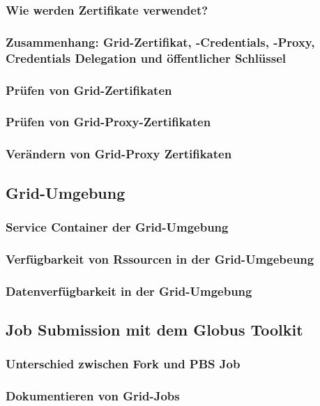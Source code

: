 	\subsubsection*{Wie werden Zertifikate verwendet?}
	\subsubsection*{Zusammenhang: Grid-Zertifikat, -Credentials, -Proxy, Credentials Delegation und öffentlicher Schlüssel}

	\subsubsection*{Prüfen von Grid-Zertifikaten}
	\subsubsection*{Prüfen von Grid-Proxy-Zertifikaten}
	\subsubsection*{Verändern von Grid-Proxy Zertifikaten}

\subsection{Grid-Umgebung}
	\subsubsection*{Service Container der Grid-Umgebung}
	\subsubsection*{Verfügbarkeit von Rssourcen in der Grid-Umgebeung}
	\subsubsection*{Datenverfügbarkeit in der Grid-Umgebung}

\subsection{Job Submission mit dem Globus Toolkit}
	\subsubsection*{Unterschied zwischen Fork und PBS Job}
	\subsubsection*{Dokumentieren von Grid-Jobs}

